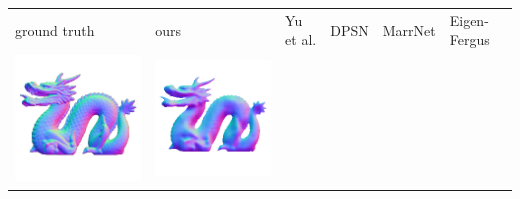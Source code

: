 \begin{tabularx}{\linewidth}{@{}Y@{}Y@{}Y@{}Y@{}Y@{}Y@{}}
ground truth & ours & Yu et al. & DPSN & MarrNet & Eigen-Fergus \\
\includegraphics[width=\linewidth]{semisynthetic/20160617_21_gt.png} &
\includegraphics[width=\linewidth]{semisynthetic/20160617_21_ours_out.png} &

\end{tabularx}
